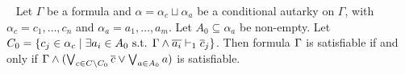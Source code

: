 %
%
%
%
%
%
%





\begin{theorem}~\label{thm:shrunkgbcequisat} Let $\Gamma$ be a formula and
    $\alpha = \alpha_c \sqcup \alpha_a$ be a conditional autarky on $\Gamma$,
    with $\alpha_c = c_1, \dots, c_n$ and $\alpha_a = a_1, \dots, a_m$.
    Let $A_0 \subseteq \alpha_a$ be non-empty.
    Let $C_0 = \{c_j \in \alpha_c
\mid \exists a_i \in A_0 \text{ s.t. }
\Gamma \land \overline{a_i} \vdash_1 \overline{c}_j \}$.
    Then formula $\Gamma$ is satisfiable if and only if
    $\Gamma \land (\bigvee_{c \in C \backslash C_0} \overline{c} \lor
    \bigvee_{a \in A_0} a)$ is satisfiable.
\end{theorem}

